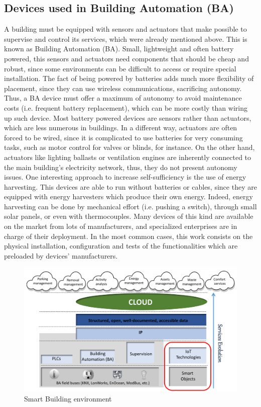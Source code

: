 \subsection{Devices used in Building Automation (BA)}
\label{subsec:Devices4BA}
A building must be equipped with sensors and actuators that make possible to supervise and control its services, which were already mentioned above.
This is known as Building Automation (BA).
Small, lightweight and often battery powered, this sensors and actuators need components that should be cheap and robust, since some environments can be difficult to access or require special installation\cite{younis2008placement}.
The fact of being powered by batteries adds much more flexibility of placement, since they can use wireless communications, sacrificing autonomy.
Thus, a BA device must offer a maximum of autonomy to avoid maintenance costs (i.e. frequent battery replacement), which can be more costly than wiring up such device.
Most battery powered devices are sensors rather than actuators, which are less numerous in buildings.
In a different way, actuators are often forced to be wired, since it is complicated to use batteries for very consuming tasks, such as motor control for valves or blinds, for instance.
On the other hand, actuators like lighting ballasts or ventilation engines are inherently connected to the main building's electricity network, thus, they do not present autonomy issues.
One interesting approach to increase self-sufficiency is the use of energy harvesting\cite{grassl2006energy}.
This devices are able to run without batteries or cables, since they are equipped with energy harvesters which produce their own energy.
Indeed, energy harvesting can be done by mechanical effort (i.e. pushing a switch), through small solar panels, or even with thermocouples.
Many devices of this kind are available on the market from lots of manufacturers, and specialized enterprises are in charge of their deployment.
In the most common cases, this work consists on the physical installation, configuration and tests of the functionalities which are preloaded by devices' manufacturers.

\begin{figure}[htb]
	\centering
	\includegraphics[width=1\columnwidth]{chapters/background.images/SmartServices.pdf}
	\caption{Smart Building environment}
	\label{fig:SmartServices}
\end{figure}

